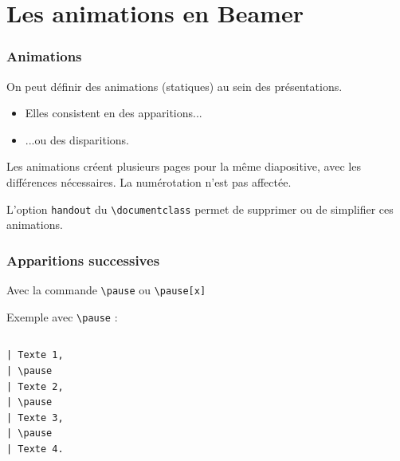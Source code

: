 \section{Les animations en Beamer}

\begin{frame}[fragile]
  \frametitle{Animations}

On peut définir des animations (statiques) au sein des présentations.
\begin{itemize}
  \item<2,4-> Elles consistent en des apparitions...
  \item<3-> ...ou des disparitions.
\end{itemize}

\bigskip
\pause[4]
Les animations créent plusieurs pages pour la même diapositive, avec les différences nécessaires. La numérotation n'est pas affectée.

\medskip
L'option \lstinline?handout? du \lstinline?\documentclass? permet de supprimer ou de simplifier ces animations.
\end{frame}



\begin{frame}[fragile]
  \frametitle{Apparitions successives}

Avec la commande \lstinline?\pause? ou \lstinline?\pause[x]?

\medskip
Exemple avec \lstinline?\pause? :

\begin{columns}
  \begin{column}{0.20\textwidth}
\begin{lstlisting}
| Texte 1,
| \pause
| Texte 2,
| \pause
| Texte 3,
| \pause
| Texte 4.
\end{lstlisting}
  \end{column}
  \begin{column}{0.35\textwidth}
  \end{column}
\end{columns}
\end{frame}



